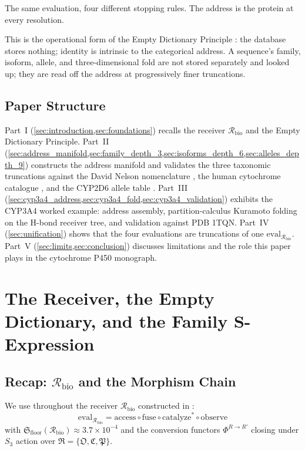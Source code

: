 \documentclass[11pt,twocolumn,a4paper]{article}
\theoremstyle{definition}
\theoremstyle{remark}
\newcommand{\Recv}{\mathcal{R}}
\newcommand{\Floor}{\mathfrak{S}_{\mathrm{floor}}}
\newcommand{\Osc}{\mathfrak{O}}
\newcommand{\Cat}{\mathfrak{C}}
\newcommand{\Part}{\mathfrak{P}}
\newcommand{\Reps}{\mathfrak{R}}
\newcommand{\eval}{\mathrm{eval}}
\begin{document}
The same evaluation, four different stopping rules. The address is the protein at every resolution.

This is the operational form of the Empty Dictionary Principle \citep{sachikonye2025c}: the database stores nothing; identity is intrinsic to the categorical address. A sequence's family, isoform, allele, and three-dimensional fold are not stored separately and looked up; they are read off the address at progressively finer truncations.

\subsection{Paper Structure}

Part~I (\cref{sec:introduction,sec:foundations}) recalls the receiver $\Recv_{\mathrm{bio}}$ and the Empty Dictionary Principle. Part~II (\cref{sec:address_manifold,sec:family_depth_3,sec:isoforms_depth_6,sec:alleles_depth_9}) constructs the address manifold and validates the three taxonomic truncations against the David Nelson nomenclature \citep{nelson2018}, the human cytochrome catalogue \citep{guengerich2018}, and the CYP2D6 allele table \citep{gaedigk2017}. Part~III (\cref{sec:cyp3a4_address,sec:cyp3a4_fold,sec:cyp3a4_validation}) exhibits the CYP3A4 worked example: address assembly, partition-calculus Kuramoto folding on the H-bond receiver tree, and validation against PDB 1TQN. Part~IV (\cref{sec:unification}) shows that the four evaluations are truncations of one $\eval_{\Recv_{\mathrm{bio}}}$. Part~V (\cref{sec:limits,sec:conclusion}) discusses limitations and the role this paper plays in the cytochrome P450 monograph.

\section{The Receiver, the Empty Dictionary, and the Family S-Expression}
\label{sec:foundations}

\subsection{Recap: $\Recv_{\mathrm{bio}}$ and the Morphism Chain}

We use throughout the receiver $\Recv_{\mathrm{bio}}$ constructed in \citep{sachikonye2025_paper1}:
\begin{equation}
\eval_{\Recv_{\mathrm{bio}}} = \mathrm{access} \circ \mathrm{fuse} \circ \mathrm{catalyze}^* \circ \mathrm{observe}
\label{eq:morphism_chain}
\end{equation}
with $\Floor(\Recv_{\mathrm{bio}}) \approx 3.7 \times 10^{-4}$ and the conversion functors $\Phi^{R \to R'}$ closing under $S_3$ action over $\Reps = \{\Osc, \Cat, \Part\}$.
\end{document}
